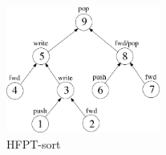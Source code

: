 \begin{figure}[!h]
    \begin{center}
        \includegraphics[width=0.45\textwidth]{figs/hfpt.eps}
    \end{center}
    \caption{HFPT-sort}
    \label{fig:hfpt}
\end{figure}%
